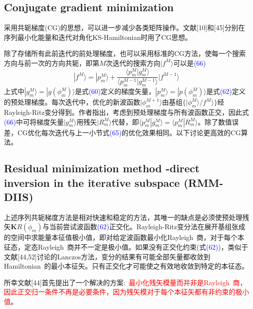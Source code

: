\documentclass[14pt]{article}      %
\begin{document}
\subsection{Conjugate gradient minimization}
采用共轭梯度\textrm{(CG)}的思想，可以进一步减少各类矩阵操作。文献[10]和[45]分别在序列最小化能量和迭代对角化\textrm{KS-Hamiltonian}时用了\textrm{CG}思想。

除了存储所有此前迭代的前处理梯度，也可以采用标准的\textrm{CG}方法，使每一个搜索方向与前一次的方向共轭，即第$M$次迭代的搜索方向$|f^M\rangle$可以是\textcolor{blue}{(66)}
\begin{displaymath}
	|f^M\rangle=|p_m^M\rangle+\dfrac{\langle p_m^M|g_m^M\rangle}{\langle p_m^{M-1}|g_m^{M-1}\rangle}|f^{M-1}\rangle
\end{displaymath}
上式中$|g_m^M\rangle=|g(\phi_m^M)\rangle$是式\textcolor{blue}{(60)}定义的梯度矢量，$|p_m^M\rangle=|p(\phi_m^M)\rangle$是式\textcolor{blue}{(62)}定义的预处理梯度。每次迭代中，优化的新波函数$|\phi_m^{M+1}\rangle$由基组$\{|\phi_m^M\rangle/f^M\rangle\}$经\textrm{Rayleigh-Ritz}变分得到。作者指出，考虑到预处理梯度与所有波函数正交，因此式\textcolor{blue}{(66)}中可将梯度矢量$|g_m^M\rangle$用残矢$|R_m^M\rangle$代替，即$\langle p_m^M|g_m^M\rangle=\langle p_m^M|R_m^M\rangle$。除了数值误差，\textrm{CG}优化每次迭代与上一小节式\textcolor{blue}{(65)}的优化效果相同。以下讨论更高效的\textrm{CG}算法。

\subsection{Residual minimization method -direct inversion in the iterative subspace (RMM-DIIS)}
上述序列共轭梯度方法是相对快速和稳定的方法，其唯一的缺点是必须使预处理残矢$\mathbf{K}R(\phi_m)$与当前尝试波函数\textcolor{blue}{(62)}正交化。\textrm{Rayleigh-Ritz}变分法在展开基组张成的空间中求能量本征值极小值，即对给定波函数最小化\textrm{Rayleigh~}商，对于每个本征态，定态\textrm{Rayleigh~}商并不一定是极小值。如果没有正交化约束(式\textcolor{blue}{(62)})，类似于文献[44,52]讨论的\textrm{Lanczos}方法，变分的结果有可能全部矢量都收敛到\textrm{Hamiltonian~}的最小本征矢。只有正交化才可能使之有效地收敛到特定的本征态。

所幸文献[44]首先提出了一个解决的方案:~\textcolor{red}{最小化残矢模量而并非是\textrm{Rayleigh~}商，因此正交归一条件不再是必要条件，因为残矢模对于每个本征矢都有非约束的极小值}。
\end{document}
